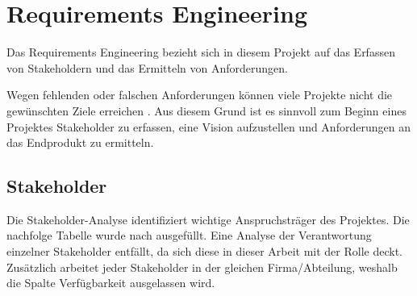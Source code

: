 \chapter{Requirements Engineering}
\label{ch:requirements}

Das Requirements Engineering bezieht sich in diesem Projekt auf das Erfassen von Stakeholdern und das Ermitteln von Anforderungen.

Wegen fehlenden oder falschen Anforderungen können viele Projekte nicht die gewünschten Ziele
erreichen \cite[S.~4-9]{Ebert:SystematischesReqEng}. Aus diesem Grund ist es sinnvoll zum Beginn eines Projektes Stakeholder zu erfassen,
eine Vision aufzustellen und Anforderungen an das Endprodukt zu ermitteln.


\section{Stakeholder}
\label{sec:stakeholder}

Die Stakeholder-Analyse identifiziert wichtige Anspruchsträger des Projektes.
Die nachfolge Tabelle wurde nach \cite[S.~58-60]{Ebert:SystematischesReqEng} ausgefüllt.
Eine Analyse der Verantwortung einzelner Stakeholder entfällt, da sich diese in dieser Arbeit mit der Rolle deckt. Zusätzlich arbeitet jeder
Stakeholder in der gleichen Firma/Abteilung, weshalb die Spalte \glqq{}Verfügbarkeit\grqq{} ausgelassen wird.

